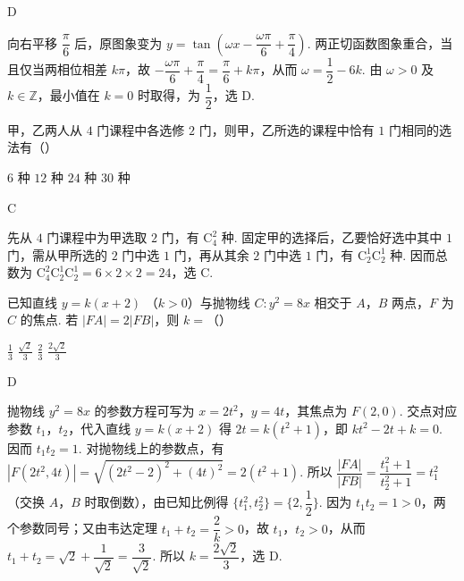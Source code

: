 \begin{answer}
D
\end{answer}

\begin{solution}
向右平移 \(\dfrac\pi6\) 后，原图象变为
\(y=\tan\left(\omega x-\dfrac{\omega\pi}{6}+\dfrac\pi4\right)\). 两正切函数图象重合，当且仅当两相位相差 \(k\pi\)，故
\(-\dfrac{\omega\pi}{6}+\dfrac\pi4=\dfrac\pi6+k\pi\)，从而 \(\omega=\dfrac12-6k\). 由 \(\omega>0\) 及 \(k\in\mathbb Z\)，最小值在 \(k=0\) 时取得，为 \(\dfrac12\)，选 D.
\end{solution}

\begin{problem}
甲，乙两人从 \(4\text{ 门}\)课程中各选修 \(2\text{ 门}\)，则甲，乙所选的课程中恰有 \(1\text{ 门}\)相同的选法有（\quad）

\choices
    {\(6\text{ 种}\)}
    {\(12\text{ 种}\)}
    {\(24\text{ 种}\)}
    {\(30\text{ 种}\)}
\end{problem}

\begin{answer}
C
\end{answer}

\begin{solution}
先从 \(4\) 门课程中为甲选取 \(2\) 门，有 \(\mathrm C_4^2\) 种. 固定甲的选择后，乙要恰好选中其中 \(1\) 门，需从甲所选的 \(2\) 门中选 \(1\) 门，再从其余 \(2\) 门中选 \(1\) 门，有 \(\mathrm C_2^1\mathrm C_2^1\) 种. 因而总数为 \(\mathrm C_4^2\mathrm C_2^1\mathrm C_2^1=6\times2\times2=24\)，选 C.
\end{solution}

\begin{problem}
已知直线 \( y = k(x + 2) \) （\( k > 0 \)）与抛物线 \( C: y^2 = 8x \) 相交于 \(A\)，\(B\) 两点，\(F\) 为 \(C\) 的焦点. 若 \( |FA| = 2|FB| \)，则 \( k = \)（\quad）

\choices
    {\( \frac{1}{3} \)}
    {\( \frac{\sqrt{2}}{3} \)}
    {\( \frac{2}{3} \)}
    {\( \frac{2\sqrt{2}}{3} \)}
\end{problem}

\begin{answer}
D
\end{answer}

\begin{solution}
抛物线 \(y^2=8x\) 的参数方程可写为 \(x=2t^2\)，\(y=4t\)，其焦点为 \(F(2,0)\). 交点对应参数 \(t_1\)，\(t_2\)，代入直线 \(y=k(x+2)\) 得 \(2t=k(t^2+1)\)，即 \(kt^2-2t+k=0\). 因而 \(t_1t_2=1\). 对抛物线上的参数点，有
\(|F(2t^2,4t)|=\sqrt{(2t^2-2)^2+(4t)^2}=2(t^2+1)\). 所以
\(\dfrac{|FA|}{|FB|}=\dfrac{t_1^2+1}{t_2^2+1}=t_1^2\)（交换 \(A\)，\(B\) 时取倒数），由已知比例得 \(\{t_1^2,t_2^2\}=\{2,\dfrac12\}\). 因为 \(t_1t_2=1>0\)，两个参数同号；又由韦达定理 \(t_1+t_2=\dfrac2k>0\)，故 \(t_1\)，\(t_2>0\)，从而 \(t_1+t_2=\sqrt2+\dfrac1{\sqrt2}=\dfrac3{\sqrt2}\). 所以 \(k=\dfrac{2\sqrt2}{3}\)，选 D.
\end{solution}

